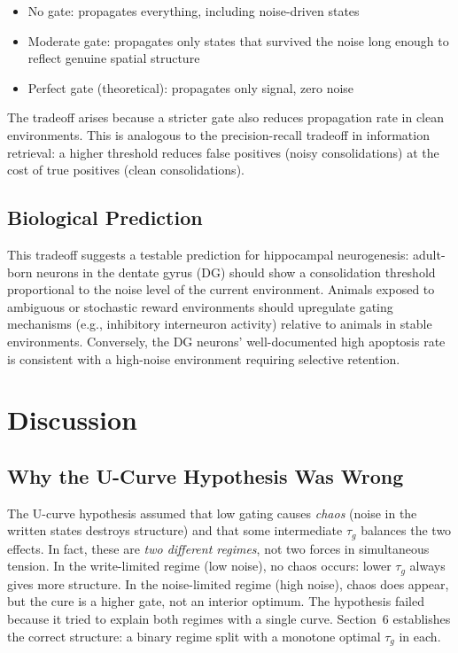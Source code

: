 \documentclass[11pt,twocolumn]{article}
\begin{document}
\begin{itemize}
  \item No gate: propagates everything, including noise-driven states
  \item Moderate gate: propagates only states that survived the noise long enough
        to reflect genuine spatial structure
  \item Perfect gate (theoretical): propagates only signal, zero noise
\end{itemize}

The tradeoff arises because a stricter gate also reduces propagation rate in
clean environments. This is analogous to the precision-recall tradeoff in
information retrieval: a higher threshold reduces false positives
(noisy consolidations) at the cost of true positives (clean consolidations).

\subsection{Biological Prediction}

This tradeoff suggests a testable prediction for hippocampal neurogenesis:
adult-born neurons in the dentate gyrus (DG) should show a consolidation
threshold proportional to the noise level of the current environment. Animals
exposed to ambiguous or stochastic reward environments should upregulate
gating mechanisms (e.g., inhibitory interneuron activity) relative to animals
in stable environments. Conversely, the DG neurons' well-documented high
apoptosis rate \cite{kempermann2015} is consistent with a high-noise environment
requiring selective retention.

\section{Discussion}

\subsection{Why the U-Curve Hypothesis Was Wrong}

The U-curve hypothesis assumed that low gating causes \emph{chaos} (noise in
the written states destroys structure) and that some intermediate $\tau_g$
balances the two effects. In fact, these are \emph{two different regimes}, not
two forces in simultaneous tension. In the write-limited regime (low noise),
no chaos occurs: lower $\tau_g$ always gives more structure. In the noise-limited
regime (high noise), chaos does appear, but the cure is a higher gate, not an
interior optimum. The hypothesis failed because it tried to explain both regimes
with a single curve. Section~6 establishes the correct structure: a binary regime
split with a monotone optimal $\tau_g$ in each.
\end{document}

